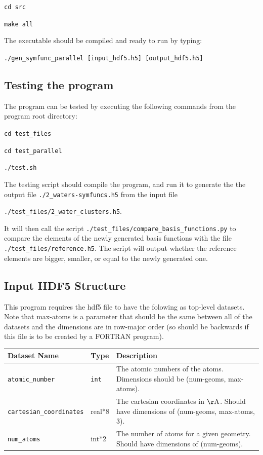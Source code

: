 \documentclass{article}
\begin{document}
\texttt{cd src}

\texttt{make all}

The executable should be compiled and ready to run by typing:

\texttt{./gen\_symfunc\_parallel [input\_hdf5.h5] [output\_hdf5.h5]}

\subsection{Testing the program}
The program can be tested by executing the following commands from the program root directory:

\texttt{cd test\_files}

\texttt{cd test\_parallel}

\texttt{./test.sh}

The testing script should compile the program, and run it to generate the the output file \texttt{./2\_waters-symfuncs.h5} from the input file

\texttt{./test\_files/2\_water\_clusters.h5}.

 It will then call the script \texttt{./test\_files/compare\_basis\_functions.py} to compare the elements of the newly generated basis functions with the file \texttt{./test\_files/reference.h5}. The script will output whether the reference elements are bigger, smaller, or equal to the newly generated one.
 
\subsection{Input HDF5 Structure}
This program requires the hdf5 file to have the folowing as top-level datasets. Note that max-atoms is a parameter that should be the same between all of the datasets and the dimensions are in row-major order (so should be backwards if this file is to be created by a FORTRAN program).


\begin{tabular}{| l | l | p{5.1cm} |}
\hline
Dataset Name & Type & Description \\
\hline
\texttt{atomic\_number} & \texttt{int\*1} & The atomic numbers of the atoms. Dimensions should be (num-geoms, max-atoms). \\
\texttt{cartesian\_coordinates} & real*8 & The cartesian coordinates in $\mathrm{\AA}$. Should have dimensions of (num-geoms, max-atoms, 3). \\
\texttt{num\_atoms} & int*2 & The number of atoms for a given geometry. Should have dimensions of (num-geoms). \\
\hline
\end{tabular}
\end{document}
